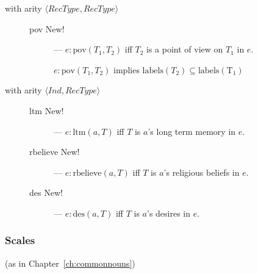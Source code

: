 \begin{description}
\begin{description}
  \end{description}

  
\item[with arity
  \textnormal{$\langle\textit{RecType},\textit{RecType}\rangle$}] \mbox{}

  \begin{description}
    
  \item[\textnormal{pov} New!] --- $e:\text{pov}(T_1,T_2)$ iff $T_2$
    is a point of view on $T_1$ in $e$.

    $e:\text{pov}(T_1,T_2)$ implies
    $\mathrm{labels}(T_2)\subseteq\mathrm{labels(T_1)}$

  \end{description}

  
\item[with arity
  \textnormal{$\langle\textit{Ind},\textit{RecType}\rangle$}] \mbox{}

  \begin{description}
    
  \item[\textnormal{ltm} New!] --- $e:\text{ltm}(a,T)$ iff $T$ is $a$'s
    long term memory in $e$.
    
  \item[\textnormal{rbelieve} New!] --- $e:\text{rbelieve}(a,T)$ iff
    $T$ is $a$'s religious beliefs in $e$.

    
  \item[\textnormal{des} New!] --- $e:\text{des}(a,T)$ iff $T$ is
    $a$'s desires in $e$.

  \end{description}
  
  

  
  
  


\end{description}

\subsubsection{Scales} (as in Chapter~\ref{ch:commonnouns})

  

  


